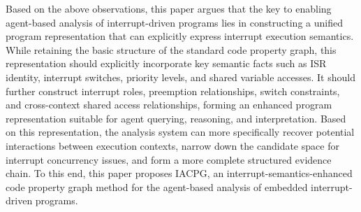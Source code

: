 \documentclass[a4paper,UKenglish,cleveref, autoref, thm-restate]{lipics-v2021}
\begin{document}
Based on the above observations, this paper argues that the key to enabling agent-based analysis of interrupt-driven programs lies in constructing a unified program representation that can explicitly express interrupt execution semantics. While retaining the basic structure of the standard code property graph, this representation should explicitly incorporate key semantic facts such as ISR identity, interrupt switches, priority levels, and shared variable accesses. It should further construct interrupt roles, preemption relationships, switch constraints, and cross-context shared access relationships, forming an enhanced program representation suitable for agent querying, reasoning, and interpretation. Based on this representation, the analysis system can more specifically recover potential interactions between execution contexts, narrow down the candidate space for interrupt concurrency issues, and form a more complete structured evidence chain. To this end, this paper proposes IACPG, an interrupt-semantics-enhanced code property graph method for the agent-based analysis of embedded interrupt-driven programs.



\end{document}
